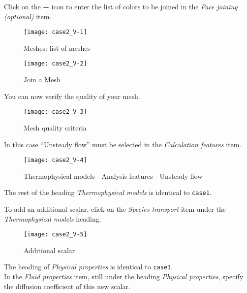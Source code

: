 Click on the {\bf +} icon to enter the list of colors to be joined in the
{\itshape Face joining (optional)} item.

\begin{figure}[h!]
\begin{center}
\texttt{[image: case2\_V-1]}
\caption{Meshes: list of meshes}
\label{fig2_e2}
\end{center}
\end{figure}


\newpage
\begin{figure}[h!]
\begin{center}
\texttt{[image: case2\_V-2]}
\caption{Join a Mesh}
\label{fig4_e2}
\end{center}
\end{figure}

\newpage
You can now verify the quality of your mesh.
\begin{figure}[h!]
\begin{center}
\texttt{[image: case2\_V-3]}
\caption{Mesh quality criteria}
\label{fig4_e2}
\end{center}
\end{figure}

\newpage
In this case ``Unsteady flow'' must be selected in the
{\itshape Calculation features} item.

\begin{figure}[h!]
\begin{center}
\texttt{[image: case2\_V-4]}
\caption{Thermophysical models - Analysis features - Unsteady flow}
\label{fig6_e2}
\end{center}
\end{figure}

The rest of the heading {\itshape Thermophysical models} is identical to \texttt{case1}.


\newpage
To add an additional scalar, click on the
{\itshape Species transport} item under the
{\itshape Thermophysical models} heading.

\begin{figure}[h!]
\begin{center}
\texttt{[image: case2\_V-5]}
\caption{Additional scalar}
\label{fig8_e2}
\end{center}
\end{figure}


\newpage
The heading of {\itshape Physical properties} is identical to \texttt{case1}.\\
In the {\itshape Fluid properties} item, still under the heading {\itshape Physical properties},
specify the diffusion coefficient of this new scalar.

